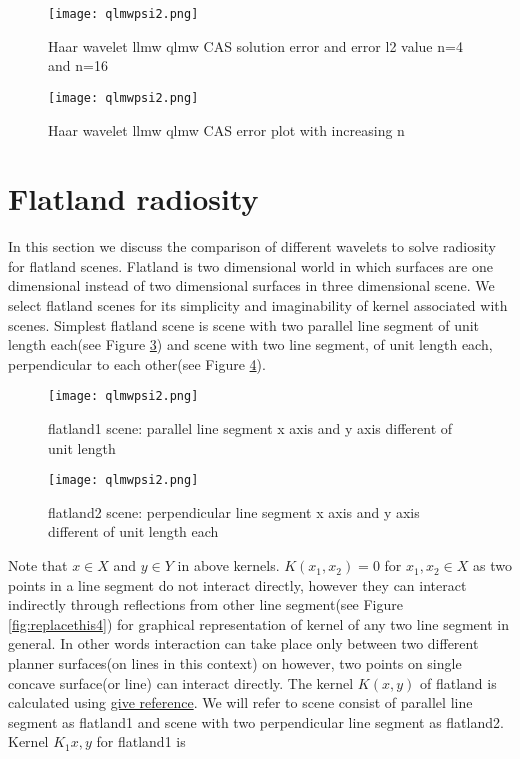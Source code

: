 \begin{figure}[tbh]
\centering{}
\captionsetup{justification=centering}
\texttt{[image: qlmwpsi2.png]}
\caption{\label{fig:replacethis}Haar wavelet llmw qlmw CAS solution error and error l2 value n=4 and n=16}
\end{figure}

\begin{figure}[tbh]
\centering{}
\captionsetup{justification=centering}
\texttt{[image: qlmwpsi2.png]}
\caption{\label{fig:replacethis1}Haar wavelet llmw qlmw CAS error plot with increasing n}
\end{figure}


\section{Flatland radiosity}
In this section we discuss the comparison of different wavelets to solve radiosity for flatland scenes. Flatland is two dimensional world in which surfaces are one dimensional instead of two dimensional surfaces in three dimensional scene. We select flatland scenes for its simplicity and imaginability of kernel associated with scenes. Simplest flatland scene is scene with two parallel line segment of unit length each(see Figure \ref{fig:replacethis2}) and scene with two line segment, of unit length each, perpendicular to each other(see Figure \ref{fig:replacethis3}). 



\begin{figure}[tbh]
\centering{}
\captionsetup{justification=centering}
\texttt{[image: qlmwpsi2.png]}
\caption{\label{fig:replacethis2}flatland1 scene: parallel line segment x axis and y axis different of unit length}
\end{figure}


\begin{figure}[tbh]
\centering{}
\captionsetup{justification=centering}
\texttt{[image: qlmwpsi2.png]}
\caption{\label{fig:replacethis3}flatland2 scene: perpendicular line segment x axis and y axis different of unit length each}
\end{figure}

Note that $x \in X$ and $y \in Y$ in above kernels. $K(x_1,x_2) = 0$ for $x_1,x_2 \in X$ as two points in a line segment do not interact directly, however they can interact indirectly through reflections from other line segment(see Figure \ref{fig:replacethis4}) for graphical representation of kernel of any two line segment in general. In other words interaction can take place only between two different planner surfaces(on lines in this context) on however, two points on single concave surface(or line) can interact directly.  The kernel $K(x,y)$ of flatland is calculated using \underline{give reference}. We will refer to scene consist of parallel line segment as flatland1 and scene with two perpendicular line segment as flatland2. Kernel $K_1{x,y}$ for flatland1 is


